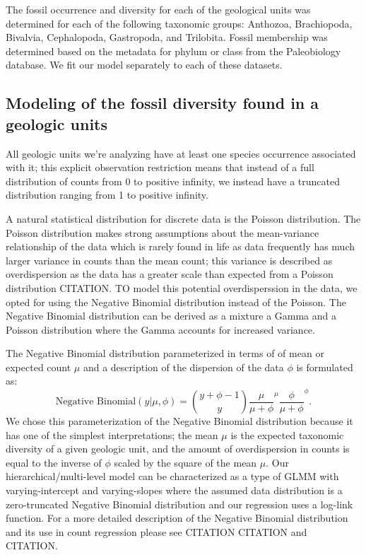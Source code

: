 \documentclass[12pt,letterpaper]{article}
\begin{document}
The fossil occurrence and diversity for each of the geological units was determined for each of the following taxonomic groups: Anthozoa, Brachiopoda, Bivalvia, Cephalopoda, Gastropoda, and Trilobita. Fossil membership was determined based on the metadata for phylum or class from the Paleobiology database. We fit our model separately to each of these datasets.





\subsection{Modeling of the fossil diversity found in a geologic units}

All geologic units we're analyzing have at least one species occurrence associated with it; this explicit observation restriction means that instead of a full distribution of counts from 0 to positive infinity, we instead have a truncated distribution ranging from 1 to positive infinity.

A natural statistical distribution for discrete data is the Poisson distribution. The Poisson distribution makes strong assumptions about the mean-variance relationship of the data which is rarely found in life as data frequently has much larger variance in counts than the mean count; this variance is described as overdispersion as the data has a greater scale than expected from a Poisson distribution CITATION. TO model this potential overdisperssion in the data, we opted for using the Negative Binomial distribution instead of the Poisson. The Negative Binomial distribution can be derived as a mixture a Gamma and a Poisson distribution where the Gamma accounts for increased variance.

The Negative Binomial distribution parameterized in terms of of mean or expected count \(\mu\) and a description of the dispersion of the data \(\phi\) is formulated as:
\begin{equation}
  \text{Negative Binomial}(y | \mu, \phi) = \binom{y + \phi - 1}{y} \frac{\mu}{\mu + \phi}^{\mu} \frac{\phi}{\mu + \phi}^{\phi}.
\end{equation}
We chose this parameterization of the Negative Binomial distribution because it has one of the simplest interpretations; the mean \(\mu\) is the expected taxonomic diversity of a given geologic unit, and the amount of overdispersion in counts is equal to the inverse of \(\phi\) scaled by the square of the mean \(\mu\). Our hierarchical/multi-level model can be characterized as a type of GLMM with varying-intercept and varying-slopes where the assumed data distribution is a zero-truncated Negative Binomial distribution and our regression uses a log-link function. For a more detailed description of the Negative Binomial distribution and its use in count regression please see CITATION CITATION and CITATION. 
\end{document}
